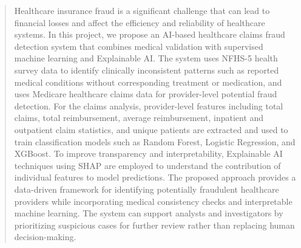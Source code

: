 \begin{abstract}

Healthcare insurance fraud is a significant challenge that can lead to financial losses and affect the efficiency and reliability of healthcare systems. In this project, we propose an AI-based healthcare claims fraud detection system that combines medical validation with supervised machine learning and Explainable AI. The system uses NFHS-5 health survey data to identify clinically inconsistent patterns such as reported medical conditions without corresponding treatment or medication, and uses Medicare healthcare claims data for provider-level potential fraud detection. For the claims analysis, provider-level features including total claims, total reimbursement, average reimbursement, inpatient and outpatient claim statistics, and unique patients are extracted and used to train classification models such as Random Forest, Logistic Regression, and XGBoost. To improve transparency and interpretability, Explainable AI techniques using SHAP are employed to understand the contribution of individual features to model predictions. The proposed approach provides a data-driven framework for identifying potentially fraudulent healthcare providers while incorporating medical consistency checks and interpretable machine learning. The system can support analysts and investigators by prioritizing suspicious cases for further review rather than replacing human decision-making.

\end{abstract}
